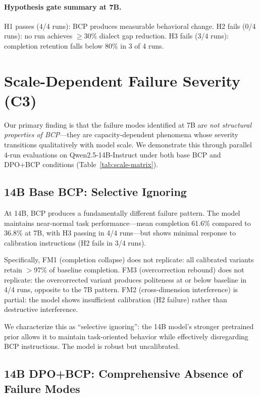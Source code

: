 \documentclass[11pt,a4paper]{article}
\begin{document}
\paragraph{Hypothesis gate summary at 7B.} H1 passes (4/4 runs): BCP produces measurable behavioral change. H2 fails (0/4 runs): no run achieves $\geq$30\% dialect gap reduction. H3 fails (3/4 runs): completion retention falls below 80\% in 3 of 4 runs.

\section{Scale-Dependent Failure Severity (C3)}
\label{sec:c3}

Our primary finding is that the failure modes identified at 7B are \emph{not structural properties of BCP}---they are capacity-dependent phenomena whose severity transitions qualitatively with model scale. We demonstrate this through parallel 4-run evaluations on Qwen2.5-14B-Instruct under both base BCP and DPO+BCP conditions (Table~\ref{tab:scale-matrix}).

\subsection{14B Base BCP: Selective Ignoring}

At 14B, BCP produces a fundamentally different failure pattern. The model maintains near-normal task performance---mean completion 61.6\% compared to 36.8\% at 7B, with H3 passing in 4/4 runs---but shows minimal response to calibration instructions (H2 fails in 3/4 runs).

Specifically, FM1 (completion collapse) does not replicate: all calibrated variants retain $>$97\% of baseline completion. FM3 (overcorrection rebound) does not replicate: the overcorrected variant produces politeness at or below baseline in 4/4 runs, opposite to the 7B pattern. FM2 (cross-dimension interference) is partial: the model shows insufficient calibration (H2 failure) rather than destructive interference.

We characterize this as ``selective ignoring'': the 14B model's stronger pretrained prior allows it to maintain task-oriented behavior while effectively disregarding BCP instructions. The model is robust but uncalibrated.

\subsection{14B DPO+BCP: Comprehensive Absence of Failure Modes}
\end{document}
